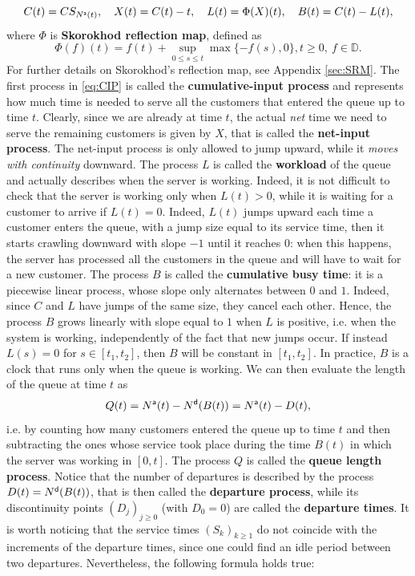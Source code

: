 \documentclass[]{amsart}
\numberwithin{equation}{section}
\theoremstyle{remark}
\theoremstyle{definition}
\begin{document}
\begin{equation}\label{eq:CIP}
	C(t)=CS_{N^{\sf a}(t)}, \quad 	X(t)=C(t)-t, \quad L(t)=\Phi(X)(t), \quad B(t)=C(t)-L(t),
\end{equation}
{where $\Phi$ is \textbf{Skorokhod reflection map}, defined as
\begin{equation*}
	\Phi(f)(t)=f(t)+\sup_{0 \le s \le t}\max\{-f(s),0\}, t \ge 0, \ f \in \mathbb{D}.
\end{equation*}
For further details on Skorokhod's reflection map, see Appendix \ref{sec:SRM}.}
The first process in \eqref{eq:CIP} is called the \textbf{cumulative-input process} and represents how much time is needed to serve all the customers that entered the queue up to time $t$. Clearly, since we are already at time $t$, the actual \textit{net} time we need to serve the remaining customers is given by $X$, that is called the \textbf{net-input process}. The net-input process is only allowed to jump upward, while it \textit{moves with continuity} downward. The process $L$ is called the \textbf{workload} of the queue and actually describes when the server is working. Indeed, it is not difficult to check that the server is working only when $L(t)>0$, while it is waiting for a customer to arrive if $L(t)=0$. Indeed, $L(t)$ jumps upward each time a customer enters the queue, with a jump size equal to its service time, then it starts crawling downward with slope $-1$ until it reaches $0$: when this happens, the server has processed all the customers in the queue and will have to wait for a new customer. The process $B$ is called the \textbf{cumulative busy time}: it is a piecewise linear process, whose slope only alternates between $0$ and $1$. Indeed, since $C$ and $L$ have jumps of the same size, they cancel each other. Hence, the process $B$ grows linearly with slope equal to $1$ when $L$ is positive, i.e. when the system is working, independently of the fact that new jumps occur. If instead $L(s)=0$ for $s \in [t_1,t_2]$, then $B$ will be constant in $[t_1,t_2]$. In practice, $B$ is a clock that runs only when the queue is working. We can then evaluate the length of the queue at time $t$ as
\begin{equation*}
	Q(t)=N^{\sf a}(t)-N^{\sf d}(B(t))=N^{\sf a}(t)-D(t),
\end{equation*}
i.e. by counting how many customers entered the queue up to time $t$ and then subtracting the ones whose service took place during the time $B(t)$ in which the server was working in $[0,t]$. The process $Q$ is called the \textbf{queue length process}. Notice that the number of departures is described by the process $D(t)=N^{\sf d}(B(t))$, that is then called the \textbf{departure process}, while its discontinuity points $(D_j)_{j \ge 0}$ (with $D_0=0$) are called the \textbf{departure times}. It is worth noticing that the service times $(S_k)_{k \ge 1}$ do not coincide with the increments of the departure times, since one could find an idle period between two departures. Nevertheless, the following formula holds true:
\end{document}
